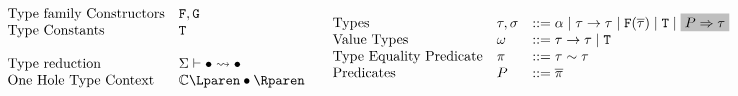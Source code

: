 \documentclass[format=acmsmall,manuscript,screen,nonacm,margin=1in,11pt]{acmart}
\begin{document}
\begin{figure}[ht]
    \footnotesize
  \[
    \begin{array}{l l l}
      &\text{Type family Constructors} &\FamCtrs,\MoreFamCtrs\\
      &\text{Type Constants} &\texttt{\TypeCtrs}\\      
      \\
      &\text{Type reduction}              &\tystepsto\GEnv\bullet\bullet\\
      &\text{One Hole Type Context}    &\TEvalCtxt{\bullet}
    \end{array}
    \begin{array}{l l l l l}
      &\text{Types}           &\tau,\sigma  &\bnfeq \alpha \bnfor \tau\to\tau %
                                              \bnfor \FamCtrs(\many\tau) \bnfor \TypeCtrs
                                              \bnfor \text{\shaded{$\Preds\then\tau$}}&\\
      &\text{Value Types}    &\GTy         &\bnfeq \tau\to\tau \bnfor \TypeCtrs\\
      &\text{Type Equality Predicate}      &\pi       &\bnfeq \tau\teq\tau\\
      &\text{Predicates}                   &\Preds    &\bnfeq \many\pi\\

\end{array}\]
\end{figure}
\end{document}
